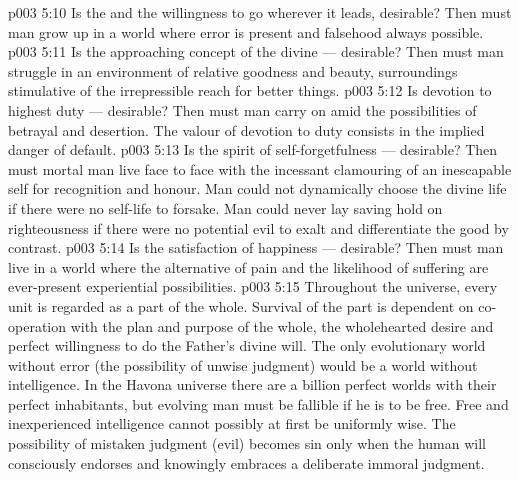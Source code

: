 \vs p003 5:10 \bibnobreakspace Is the  and the willingness to go wherever it leads, desirable? Then must man grow up in a world where error is present and falsehood always possible.
\vs p003 5:11 \bibnobreakspace Is  the approaching concept of the divine --- desirable? Then must man struggle in an environment of relative goodness and beauty, surroundings stimulative of the irrepressible reach for better things.
\vs p003 5:12 \bibnobreakspace Is  devotion to highest duty --- desirable? Then must man carry on amid the possibilities of betrayal and desertion. The valour of devotion to duty consists in the implied danger of default.
\vs p003 5:13 \bibnobreakspace Is  the spirit of self\hyp{}forgetfulness --- desirable? Then must mortal man live face to face with the incessant clamouring of an inescapable self for recognition and honour. Man could not dynamically choose the divine life if there were no self\hyp{}life to forsake. Man could never lay saving hold on righteousness if there were no potential evil to exalt and differentiate the good by contrast.
\vs p003 5:14 \bibnobreakspace Is  the satisfaction of happiness --- desirable? Then must man live in a world where the alternative of pain and the likelihood of suffering are ever\hyp{}present experiential possibilities.
\vs p003 5:15 \pc Throughout the universe, every unit is regarded as a part of the whole. Survival of the part is dependent on co\hyp{}operation with the plan and purpose of the whole, the wholehearted desire and perfect willingness to do the Father’s divine will. The only evolutionary world without error (the possibility of unwise judgment) would be a world without  intelligence. In the Havona universe there are a billion perfect worlds with their perfect inhabitants, but evolving man must be fallible if he is to be free. Free and inexperienced intelligence cannot possibly at first be uniformly wise. The possibility of mistaken judgment (evil) becomes sin only when the human will consciously endorses and knowingly embraces a deliberate immoral judgment.
